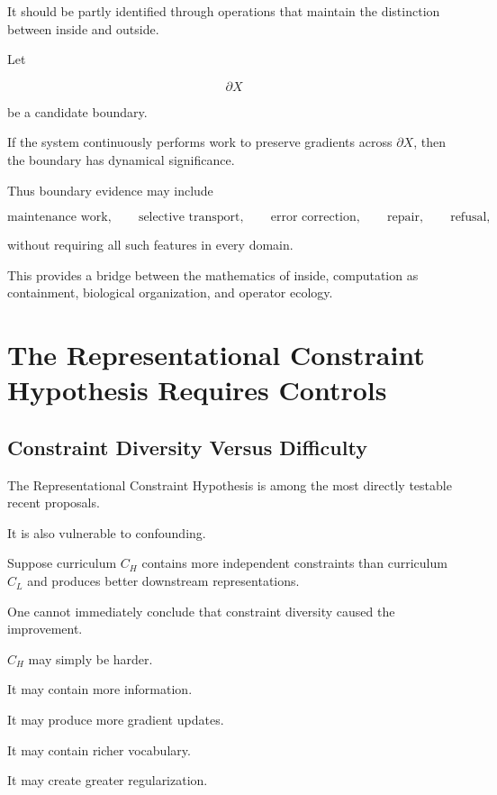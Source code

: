 \documentclass[11pt]{article}
\theoremstyle{remark}
\begin{document}
It should be partly identified through operations that maintain the distinction between inside and outside.

Let

\begin{equation}
\partial X
\end{equation}

be a candidate boundary.

If the system continuously performs work to preserve gradients across $\partial X$, then the boundary has dynamical significance.

Thus boundary evidence may include

\begin{equation}
\text{maintenance work},
\qquad
\text{selective transport},
\qquad
\text{error correction},
\qquad
\text{repair},
\qquad
\text{refusal},
\end{equation}

without requiring all such features in every domain.

This provides a bridge between the mathematics of inside, computation as containment, biological organization, and operator ecology.

\section{The Representational Constraint Hypothesis Requires Controls}

\subsection{Constraint Diversity Versus Difficulty}

The Representational Constraint Hypothesis is among the most directly testable recent proposals.

It is also vulnerable to confounding.

Suppose curriculum $C_H$ contains more independent constraints than curriculum $C_L$ and produces better downstream representations.

One cannot immediately conclude that constraint diversity caused the improvement.

$C_H$ may simply be harder.

It may contain more information.

It may produce more gradient updates.

It may contain richer vocabulary.

It may create greater regularization.
\end{document}
